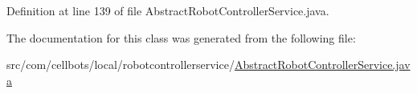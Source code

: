 Definition at line 139 of file Abstract\-Robot\-Controller\-Service.\-java.



The documentation for this class was generated from the following file\-:\begin{DoxyCompactItemize}
\item 
src/com/cellbots/local/robotcontrollerservice/\hyperlink{_abstract_robot_controller_service_8java}{Abstract\-Robot\-Controller\-Service.\-java}\end{DoxyCompactItemize}
